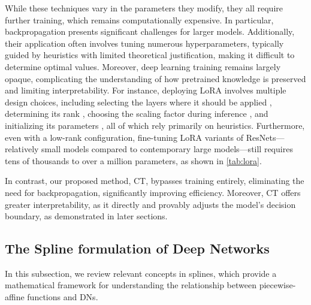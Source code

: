 While these techniques vary in the parameters they modify, they all require further training, which remains computationally expensive. In particular, backpropagation presents significant challenges for larger models. Additionally, their application often involves tuning numerous hyperparameters, typically guided by heuristics with limited theoretical justification, making it difficult to determine optimal values. Moreover, deep learning training remains largely opaque, complicating the understanding of how pretrained knowledge is preserved and limiting interpretability. For instance, deploying LoRA involves multiple design choices, including selecting the layers where it should be applied \cite{gao2024lorawhere}, determining its rank \cite{valipour2022dylora, chen2024autorank}, choosing the scaling factor during inference \cite{kalajdzievski2023lorascaling}, and initializing its parameters \cite{hayou2024lorainit}, all of which rely primarily on heuristics. Furthermore, even with a low-rank configuration, fine-tuning LoRA variants of ResNets—relatively small models compared to contemporary large models—still requires tens of thousands to over a million parameters, as shown in \cref{tab:lora}.

In contrast, our proposed method, CT, bypasses training entirely, eliminating the need for backpropagation, significantly improving efficiency. Moreover, CT offers greater interpretability, as it directly and provably adjusts the model's decision boundary, as demonstrated in later sections.



\subsection{The Spline formulation of Deep Networks}\label{sec:spline}
In this subsection, we review relevant concepts in splines, which provide a mathematical framework for understanding the relationship between piecewise-affine functions and DNs.

